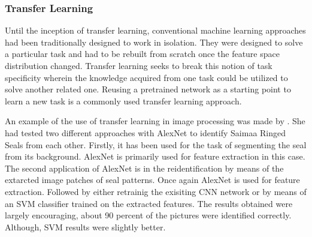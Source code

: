 \documentclass[doc/report.tex]{subfiles}
\begin{document}
\subsubsection{Transfer Learning}
Until the inception of transfer learning, conventional machine learning
approaches had been traditionally designed to work in isolation. They were
designed to solve a particular task and had to be rebuilt from scratch once the
feature space distribution changed. Transfer learning seeks to break this
notion of task specificity wherein the knowledge acquired from one task could
be utilized to solve another related one. Reusing a pretrained network as a
starting point to learn a new task is a commonly used transfer learning
approach.

An example of the use of transfer learning in image processing was made by
\cite{Ekat}. She had tested two different approaches with AlexNet to identify
Saimaa Ringed Seals from each other. Firstly, it has been used for the task of
segmenting the seal from its background. AlexNet is primarily used for feature
extraction in this case. The second application of AlexNet is in the
reidentification by means of the extarcted image patches of seal patterns. Once
again AlexNet is used for feature extraction. Followed by either retrainig the
exisiting CNN network or by means of an SVM classifier trained on the extracted
features. The results obtained were largely encouraging, about 90 percent of
the pictures were identified correctly. Although, SVM results were slightly
better.
\end{document}
